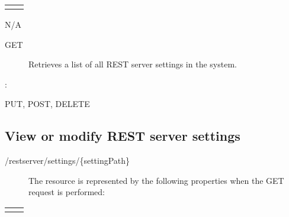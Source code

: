 \documentclass[letterpaper,10pt,english]{sphinxmanual}
\begin{document}
\begin{savenotes}\sphinxattablestart
\centering
\begin{tabulary}{\linewidth}[t]{|T|T|}
\hline

&
\\
\hline&\\
\hline
\end{tabulary}
\par
\sphinxattableend\end{savenotes}

 N/A
\begin{description}
\item[{ GET}] \leavevmode
Retrieves a list of all REST server settings in the system.

\end{description}

:

\begin{sphinxVerbatim}[commandchars=\\\{\}]
\end{sphinxVerbatim}

 PUT, POST, DELETE


\subsection{View or modify REST server settings}
\label{\detokenize{restapi:view-or-modify-rest-server-settings}}
 /restserver/settings/\{settingPath\}
\begin{description}
\item[{}] \leavevmode
The resource is represented by the following properties when the GET request is performed:

\end{description}


\begin{savenotes}\sphinxattablestart
\centering
\begin{tabulary}{\linewidth}[t]{|T|T|}
\hline

&
\\
\hline&\\
\hline
\end{tabulary}
\par
\sphinxattableend\end{savenotes}
\end{document}
